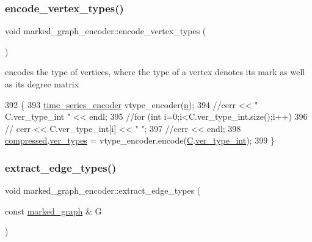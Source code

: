 \subsubsection{\texorpdfstring{encode\+\_\+vertex\+\_\+types()}{encode\_vertex\_types()}}
{\footnotesize\ttfamily void marked\+\_\+graph\+\_\+encoder\+::encode\+\_\+vertex\+\_\+types (\begin{DoxyParamCaption}{ }\end{DoxyParamCaption})\hspace{0.3cm}{\ttfamily [private]}}



encodes the type of vertices, where the type of a vertex denotes its mark as well as its degree matrix 


\begin{DoxyCode}
392 \{
393   \hyperlink{classtime__series__encoder}{time\_series\_encoder} vtype\_encoder(\hyperlink{classmarked__graph__encoder_a4c66d9fdbc14c97523715aac7e4511cb}{n});
394   \textcolor{comment}{//cerr << " C.ver\_type\_int " << endl;}
395   \textcolor{comment}{//for (int i=0;i<C.ver\_type\_int.size();i++)}
396   \textcolor{comment}{//  cerr << C.ver\_type\_int[i] << " ";}
397   \textcolor{comment}{//cerr << endl;}
398   \hyperlink{classmarked__graph__encoder_ac2ded200860fdd2321f86dd76b28bcb3}{compressed}.\hyperlink{classmarked__graph__compressed_af446cc5e23c241a92b76642fd5ebc403}{ver\_types} = vtype\_encoder.encode(\hyperlink{classmarked__graph__encoder_af82bc0653414091291cb75553a407bdb}{C}.\hyperlink{classcolored__graph_a491ed2ea1a65118af02ec606c8d44c0a}{ver\_type\_int});
399 \}
\end{DoxyCode}
\mbox{\label{classmarked__graph__encoder_ac3060e8f7e6abbe371c5968eb47cb8a1}} 
\subsubsection{\texorpdfstring{extract\+\_\+edge\+\_\+types()}{extract\_edge\_types()}}
{\footnotesize\ttfamily void marked\+\_\+graph\+\_\+encoder\+::extract\+\_\+edge\+\_\+types (\begin{DoxyParamCaption}\item[{const \hyperlink{classmarked__graph}{marked\+\_\+graph} \&}]{G }\end{DoxyParamCaption})\hspace{0.3cm}{\ttfamily [private]}}



